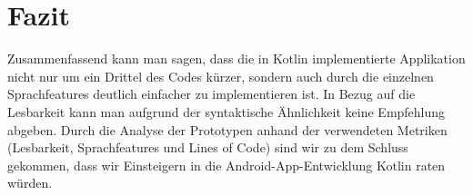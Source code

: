 \documentclass{sigchi-ext}
\begin{document}
\section{Fazit}
Zusammenfassend kann man sagen, dass die in Kotlin implementierte Applikation nicht nur um ein Drittel des Codes kürzer, sondern auch durch die einzelnen Sprachfeatures deutlich einfacher zu implementieren ist. In Bezug auf die Lesbarkeit kann man aufgrund der syntaktische Ähnlichkeit keine Empfehlung abgeben. Durch die Analyse der Prototypen anhand der verwendeten Metriken (Lesbarkeit, Sprachfeatures und Lines of Code) sind wir zu dem Schluss gekommen, dass wir Einsteigern in die Android-App-Entwicklung Kotlin raten würden.





\end{document}
